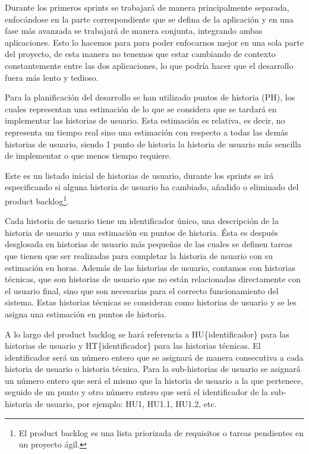 Durante los primeros sprints se trabajará de manera principalmente separada, enfocándose en la parte correspondiente que se defina de la aplicación y en una fase más avanzada se trabajará de manera conjunta, integrando ambas aplicaciones. Esto lo hacemos para para poder enfocarnos mejor en una sola parte del proyecto, de esta manera no tenemos que estar cambiando de contexto constantemente entre las dos aplicaciones, lo que podría hacer que el desarrollo fuera más lento y tedioso.

Para la planificación del desarrollo se han utilizado puntos de historia (PH), los cuales representan una estimación de lo que se considera que se tardará en implementar las historias de usuario. Esta estimación es relativa, es decir, no representa un tiempo real sino una estimación con respecto a todas las demás historias de usuario, siendo 1 punto de historia la historia de usuario más sencilla de implementar o que menos tiempo requiere.

Este es un listado inicial de historias de usuario, durante los sprints se irá especificando si alguna historia de usuario ha cambiado, añadido o eliminado del product backlog\footnote{El product backlog es una lista priorizada de requisitos o tareas pendientes en un proyecto ágil.}.

Cada historia de usuario tiene un identificador único, una descripción de la historia de usuario y una estimación en puntos de historia. Ésta es después desglosada en historias de usuario más pequeñas de las cuales se definen tareas que tienen que ser realizadas para completar la historia de usuario con su estimación en horas.
Además de las historias de usuario, contamos con historias técnicas, que son historias de usuario que no están relacionadas directamente con el usuario final, sino que son necesarias para el correcto funcionamiento del sistema. Estas historias técnicas se consideran como historias de usuario y se les asigna una estimación en puntos de historia.

A lo largo del product backlog  se hará referencia a HU\{identificador\} para las historias de usuario y HT\{identificador\} para las historias técnicas. El identificador será un número entero que se asignará de manera consecutiva a cada historia de usuario o historia técnica. Para la sub-historias de usuario se asignará un número entero que será el mismo que la historia de usuario a la que pertenece, seguido de un punto y otro número entero que será el identificador de la sub-historia de usuario, por ejemplo: HU1, HU1.1, HU1.2, etc.

